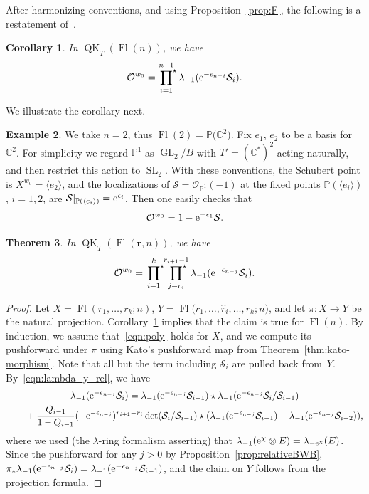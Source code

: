 \documentclass[pdftex]{sigma}
\numberwithin{equation}{section}
\newtheorem{Theorem}{Theorem}[section]
\newtheorem{Corollary}[Theorem]{Corollary}
\theoremstyle{definition}
\newtheorem{Example}[Theorem]{Example}
\DeclareMathOperator{\GL}{GL}
\DeclareMathOperator{\SL}{SL}
\DeclareMathOperator{\Fl}{Fl}
\DeclareMathOperator{\QK}{QK}
\newcommand{\bfr}{{\mathbf r}}
\newcommand{\bP}{{\mathbb P}}
\newcommand{\C}{{\mathbb C}}
\newcommand{\cO}{{\mathcal O}}
\newcommand{\cS}{{\mathcal S}}
\begin{document}
After harmonizing conventions, and using Proposition~\ref{prop:F}, the following is a restatement of~\cite[Proposition~3.1]{maeno2023presentation}.
 \begin{Corollary}\label{cor:pt-class}
 In $\QK_T(\Fl(n))$, we have
 \[
 \cO^{w_0}=\sideset{}{^\star}\prod_{i=1}^{n-1}\lambda_{-1}({\rm e}^{-\epsilon_{n-i}} \cS_i).
 \]
\end{Corollary}
We illustrate the corollary next.
\begin{Example} We take $n=2$, thus $\Fl(2) = \bP\bigl(\C^2\bigr)$. Fix $e_1$, $e_2$ to be a basis for $\C^2$. For simplicity we regard $\bP^1$ as $\GL_2/B$ with $T'=(\C^*)^2$ acting naturally, and then restrict this action to $\SL_2$.
With these conventions, the Schubert point is $X^{w_0} = \langle e_2 \rangle$, and
the localizations of $\cS= \cO_{\bP^1}(-1)$ at the fixed points $\bP(\langle e_i \rangle)$, $i=1,2$, are $\cS|_{\bP(\langle e_i \rangle)}={\rm e}^{\epsilon_i}$. Then one easily checks that
\[ \cO^{w_0} = 1 - {\rm e}^{-\epsilon_1} \cS . \]
\end{Example}
\begin{Theorem}\label{thm:w0}
 In $\QK_T(\Fl(\bfr,n))$, we have
 \begin{gather}\label{eqn:poly}
 \cO^{w_0}=\sideset{}{^\star}\prod_{i=1}^{k}\sideset{}{^\star}\prod_{j=r_i}^{r_{i+1}-1}\lambda_{-1}({\rm e}^{-\epsilon_{n-j}} \cS_i) .
 \end{gather}
\end{Theorem}
\begin{proof}
 Let $X=\Fl(r_1,\dots,r_k;n)$, $Y=\Fl\bigl(r_1,\dots, \widehat{r}_i,\dots, r_k;n\bigr)$, and let
 $\pi\colon X\to Y$ be the natural projection. Corollary~\ref{cor:pt-class} implies that the
 claim is true for $\Fl(n)$. By induction, we assume that~\eqref{eqn:poly} holds for
 $X$, and we compute its pushforward under $\pi$ using Kato's pushforward map
 from Theorem~\ref{thm:kato-morphism}.
 Note that all but the term including
 $\cS_i$ are pulled back from~$Y$. By~\eqref{eqn:lambda_y_rel}, we have
\begin{gather*}
 \lambda_{-1}({\rm e}^{-\epsilon_{n-j}} \cS_i)=\lambda_{-1}({\rm e}^{-\epsilon_{n-j}}\cS_{i-1})\star\lambda_{-1}({\rm e}^{-\epsilon_{n-j}} \cS_i/\cS_{i-1})\\
 \qquad{}+\frac{Q_{i-1}}{1-Q_{i-1}}{ (-{\rm e}^{-\epsilon_{n-j}})^{r_{i+1}-r_i}} \det(\cS_i/\cS_{i-1})\star(\lambda_{-1}({\rm e}^{-\epsilon_{n-j}}\cS_{i-1})-\lambda_{-1}({\rm e}^{-\epsilon_{n-j}}\cS_{i-2})),
\end{gather*}
where we used (the $\lambda$-ring formalism asserting) that
 $\lambda_{-1}({\rm e}^\chi \otimes E) = \lambda_{-{\rm e}^{\chi}}(E)$. Since the pushforward
\smash{$\pi_*\bigl(\wedge^j \cS_i/\cS_{i-1}\bigr)\!=\!0$} for any $j>0$ by Proposition~\ref{prop:relativeBWB},
$\pi_*\lambda_{-1}({\rm e}^{-\epsilon_{n-j}} \cS_i)=\lambda_{-1}({\rm e}^{-\epsilon_{n-j}}\cS_{i-1})$,
and the claim on $Y$ follows from the projection formula.
\end{proof}
\end{document}
